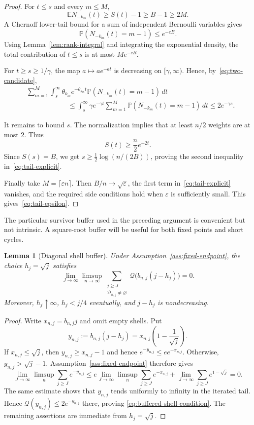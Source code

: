 \documentclass[11pt]{article}
\newtheorem{lemma}[theorem]{Lemma}
\theoremstyle{remark}
\theoremstyle{plain}
\newcommand{\E}{\mathbb E}
\newcommand{\Pp}{\mathbb P}
\newcommand{\eps}{\varepsilon}
\begin{document}
\begin{proof}
For $t\le s$ and every $m\le M$,
\[
 \E N_{-k_m}(t)\ge S(t)-1\ge B-1\ge2M.
\]
A Chernoff lower-tail bound for a sum of independent Bernoulli variables gives
\[
 \Pp(N_{-k_m}(t)=m-1)\le e^{-cB}.
\]
Using Lemma~\ref{lem:rank-integral} and integrating the exponential density,
the total contribution of $t\le s$ is at most $Me^{-cB}$.

For $t\ge s\ge1/\gamma$, the map $a\mapsto ae^{-at}$ is decreasing on
$[\gamma,\infty)$.  Hence, by~\eqref{eq:two-candidate},
\begin{align*}
 &\sum_{m=1}^M\int_s^\infty
 \theta_{k_m}e^{-\theta_{k_m}t}
 \Pp(N_{-k_m}(t)=m-1)\,dt\\
 &\hspace{1in}\le
 \int_s^\infty\gamma e^{-\gamma t}
 \sum_{m=1}^M\Pp(N_{-k_m}(t)=m-1)\,dt
 \le2e^{-\gamma s}.
\end{align*}

It remains to bound $s$.  The normalization implies that at least $n/2$
weights are at most $2$.  Thus
\[
 S(t)\ge\frac n2e^{-2t}.
\]
Since $S(s)=B$, we get $s\ge\frac12\log(n/(2B))$, proving the second
inequality in~\eqref{eq:tail-explicit}.

Finally take $M=\lceil\eps n\rceil$.  Then $B/n\to\sqrt\eps$, the first
term in~\eqref{eq:tail-explicit} vanishes, and the required side conditions
hold when $\eps$ is sufficiently small.  This gives~\eqref{eq:tail-epsilon}.
\end{proof}

The particular survivor buffer used in the preceding argument is convenient
but not intrinsic.  A square-root buffer will be useful for both fixed points
and short cycles.

\begin{lemma}[Diagonal shell buffer]
\label{lem:diagonal-shell-buffer}
Under Assumption~\ref{ass:fixed-endpoint}, the choice $h_j=\sqrt j$ satisfies
\begin{equation}\label{eq:buffered-shell-condition}
 \lim_{J\to\infty}\limsup_{n\to\infty}
 \sum_{\substack{j\ge J\\\mathcal D_{n,j}\ne\varnothing}}
 \mathcal Q\bigl(b_{n,j}(j-h_j)\bigr)=0.
\end{equation}
Moreover, $h_j\uparrow\infty$, $h_j<j/4$ eventually, and $j-h_j$ is
nondecreasing.
\end{lemma}

\begin{proof}
Write $x_{n,j}=b_{n,j}j$ and omit empty shells.  Put
\[
 y_{n,j}:=b_{n,j}(j-h_j)
 =x_{n,j}\left(1-\frac1{\sqrt j}\right).
 \]
If $x_{n,j}\le\sqrt j$, then $y_{n,j}\ge x_{n,j}-1$ and hence
$e^{-y_{n,j}}\le e e^{-x_{n,j}}$.  Otherwise,
$y_{n,j}>\sqrt j-1$.  Assumption~\ref{ass:fixed-endpoint} therefore gives
\[
 \lim_{J\to\infty}\limsup_n\sum_{j\ge J}e^{-y_{n,j}}
 \le
 e\lim_{J\to\infty}\limsup_n\sum_{j\ge J}e^{-x_{n,j}}
 +\lim_{J\to\infty}\sum_{j\ge J}e^{1-\sqrt j}=0.
\]
The same estimate shows that $y_{n,j}$ tends uniformly to infinity in the
iterated tail.  Hence $\mathcal Q(y_{n,j})\le2e^{-y_{n,j}}$ there, proving
\eqref{eq:buffered-shell-condition}.  The remaining assertions are immediate
from $h_j=\sqrt j$.
\end{proof}
\end{document}
